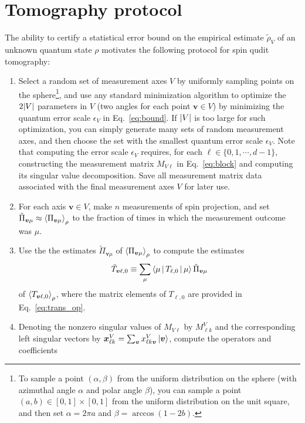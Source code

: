 \documentclass[a4paper,twocolumn,unpublished]{quantumarticle}
\newcommand{\p}[1]{\left(#1\right)} %
\newcommand{\bk}{\Braket} %
\renewcommand{\set}[1]{\{#1\}} %
\begin{document}
\section{Tomography protocol}
\label{sec:protocol}


The ability to certify a statistical error bound on the empirical estimate $\tilde\rho_V$ of an unknown quantum state $\rho$ motivates the following protocol for spin qudit tomography:
\begin{enumerate}
\item Select a random set of measurement axes $V$ by uniformly sampling points on the sphere\footnote{To sample a point $\p{\alpha,\beta}$ from the uniform distribution on the sphere (with azimuthal angle $\alpha$ and polar angle $\beta$), you can sample a point $\p{a,b}\in[0,1]\times[0,1]$ from the uniform distribution on the unit square, and then set $\alpha=2\pi a$ and $\beta=\arccos\p{1-2b}$.}, and use any standard minimization algorithm to optimize the $2\abs{V}$ parameters in $V$ (two angles for each point $\bm v\in V$) by minimizing the quantum error scale $\epsilon_V$ in Eq.~\eqref{eq:bound}.
  If $\abs{V}$ is too large for such optimization, you can simply generate many sets of random measurement axes, and then choose the set with the smallest quantum error scale $\epsilon_V$.
  Note that computing the error scale $\epsilon_V$ requires, for each $\ell\in\set{0,1,\cdots,d-1}$, constructing the measurement matrix $M_{V\ell}$ in Eq.~\eqref{eq:block} and computing its singular value decomposition.
  Save all measurement matrix data associated with the final measurement axes $V$ for later use.
\item For each axis $\bm v\in V$, make $n$ measurements of spin projection, and set $\tilde\Pi_{\bm v\mu}\approx\bk{\Pi_{\bm v\mu}}_\rho$ to the fraction of times in which the measurement outcome was $\mu$.
\item Use the the estimates $\tilde\Pi_{\bm v\mu}$ of $\bk{\Pi_{\bm v\mu}}_\rho$ to compute the estimates
\begin{align}
  \tilde T_{\bm v\ell,0}
  \equiv \sum_\mu \bk{\mu|T_{\ell,0}|\mu} \tilde\Pi_{\bm v\mu}
\end{align}
of $\bk{T_{\bm v\ell,0}}_\rho$, where the matrix elements of $T_{\ell,0}$ are provided in Eq.~\eqref{eq:trans_op}.
\item Denoting the nonzero singular values of $M_{V\ell}$ by $M^V_{\ell k}$ and the corresponding left singular vectors by $\bm x^V_{\ell k} = \sum_{\bm v} x^V_{\ell k \bm v} \ket{\bm v}$, compute the  operators and coefficients

\end{enumerate}
\end{document}
